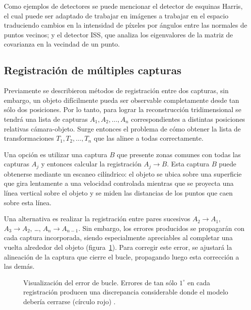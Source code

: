 Como ejemplos de detectores se puede mencionar el detector de esquinas Harris,
el cual puede ser adaptado de trabajar en imágenes a trabajar en el espacio
traduciendo cambios en la intensidad de píxeles por ángulos entre las normales de puntos vecinos;
y el detector ISS, que analiza los eigenvalores de la matriz de covarianza en la vecindad de un punto.


\subsection{Registración de múltiples capturas}
Previamente se describieron métodos de registración entre dos capturas,
sin embargo, un objeto difícilmente pueda ser observable completamente desde tan sólo dos posiciones.
Por lo tanto, para lograr la reconstrucción tridimensional se tendrá una lista de capturas
${A_1, A_2, \ldots, A_n}$ correspondientes a distintas posiciones relativas cámara-objeto.
Surge entonces el problema de cómo obtener la lista de transformaciones ${T_1, T_2, \ldots, T_n}$
que las alinee a todas correctamente.

Una opción es utilizar una captura $B$ que presente zonas comunes con todas las capturas $A_j$
y entonces calcular la registración $A_j \to B$.
Esta captura $B$ puede obtenerse mediante un escaneo cilíndrico: el objeto se
ubica sobre una superficie que gira lentamente a una velocidad controlada
mientras que se proyecta una línea vertical sobre el objeto y se miden las
distancias de los puntos que caen sobre esta línea.

Una alternativa es realizar la registración entre pares sucesivos
$A_2 \to A_1$,
$A_3 \to A_2$,
\ldots,
$A_{n} \to A_{n-1}$.
Sin embargo, los errores producidos se propagarán con cada
captura incorporada, siendo especialmente apreciables al completar una
vuelta alrededor del objeto (figura~\ref{fig:error_bucle}).
Para corregir este error, se ajustará la alineación de la captura que cierre el bucle,
propagando luego esta corrección a las demás.


	\begin{figure}
		\caption{\label{fig:error_bucle}Visualización del error de bucle. Errores de tan sólo $1^{\circ}$
		en cada registración producen una discrepancia considerable
		donde el modelo debería cerrarse (círculo rojo) .}
	\end{figure}
